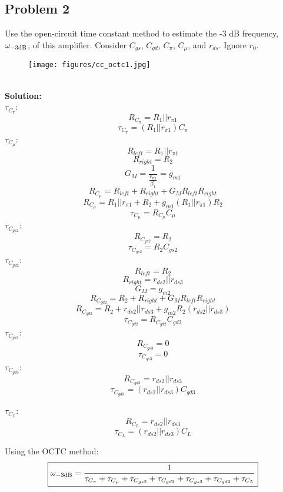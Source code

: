 \documentclass{article}
\begin{document}
\subsection*{Problem 2}
Use the open-circuit time constant method to estimate the -3 dB frequency, $\omega_{\rm -3 dB}$, of this amplifier.  Consider $C_{gs}$, $C_{gd}$, $C_{\pi}$, $C_{\mu}$, and $r_{ds}$.  Ignore $r_0$. \\ 
\begin{figure}[!h]
\begin{center}
    \texttt{[image: figures/cc\_octc1.jpg]}
\end{center}
\end{figure} \\
\textbf{Solution:} \\
$\tau_{C_{\pi}}$:
$$R_{C_{\pi}} = R_1 || r_{\pi 1}$$
$$\boxed{\tau_{C_{\pi}} = \left(R_1 || r_{\pi 1}\right)C_{\pi}}$$
$\tau_{C_{\mu}}$:
$$R_{left} = R_1 || r_{\pi 1}$$
$$R_{right} = R_2$$
$$G_M = \frac{1}{\frac{r_{\pi 1}}{\beta _1}} = g_{m1}$$
$$R_{C_{\mu}} = R_{left} + R_{right} + G_MR_{left}R_{right}$$
$$\boxed{R_{C_{\mu}} = R_1 || r_{\pi 1} + R_2 + g_{m1}\left(R_1 || r_{\pi 1}\right)R_2}$$
$$\boxed{\tau_{C_{\mu}} = R_{C_{\mu}}C_{\mu}}$$
$\tau_{C_{gs2}}$:
$$R_{C_{gs2}} = R_2$$
$$\boxed{\tau_{C_{gs2}} = R_2C_{gs2}}$$
$\tau_{C_{gd2}}$:
$$R_{left} = R_2$$
$$R_{right} = r_{ds2}||r_{ds3}$$
$$G_M = g_{m2}$$
$$R_{C_{gd2}} = R_2 + R_{right} + G_MR_{left}R_{right}$$
$$\boxed{R_{C_{gd2}} = R_2 + r_{ds2}||r_{ds3} + g_{m2}R_2\left(r_{ds2}||r_{ds3}\right)}$$
$$\boxed{\tau_{C_{gd2}} = R_{C_{gd2}}C_{gd2}}$$
$\tau_{C_{gs3}}$:
$$R_{C_{gs3}} = 0$$
$$\boxed{\tau_{C_{gs3}} = 0}$$
$\tau_{C_{gd3}}$:
$$R_{C_{gd3}} = r_{ds2}||r_{ds3}$$
$$\boxed{\tau_{C_{gd3}} = \left(r_{ds2}||r_{ds3}\right)C_{gd3}}$$

$\tau_{C_L}$:
$$R_{C_L} = r_{ds2}||r_{ds3}$$
$$\boxed{\tau_{C_L} = \left(r_{ds2}||r_{ds3}\right)C_{L}}$$

Using the OCTC method:
$$\boxed{\omega_{\rm -3dB} = \frac{1}{\tau_{C_{\pi}} + \tau_{C_{\mu}} + \tau_{C_{gs2}} + \tau_{C_{gd2}} + \tau_{C_{gs3}} + \tau_{C_{gd3}} + \tau_{C_L}}}$$
\newpage
\end{document}
